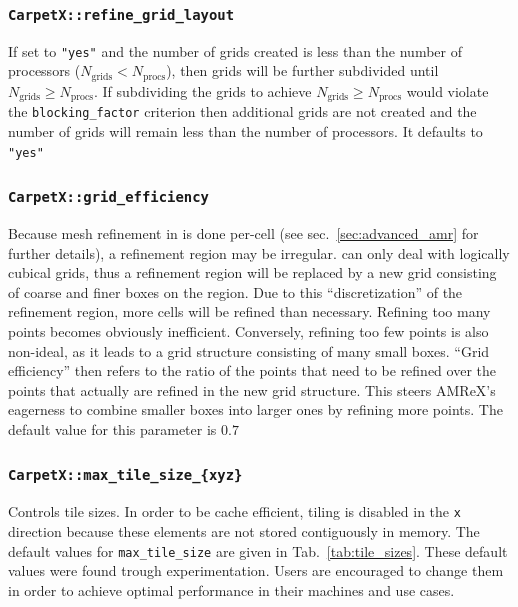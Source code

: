 \subsubsection{\texttt{CarpetX::refine\_grid\_layout}}

If set to \texttt{"yes"} and the number of grids created is less than the number of processors ($N_\text{grids} < N_\text{procs}$), then grids will be further subdivided until $N_\text{grids} \geq N_\text{procs}$. If subdividing the grids to achieve $N_\text{grids} \geq N_\text{procs}$ would violate the \texttt{blocking\_factor} criterion then additional grids are not created and the number of grids will remain less than the number of processors. It defaults to \texttt{"yes"}

\subsubsection{\texttt{CarpetX::grid\_efficiency}}

Because mesh refinement in \AMReX is done per-cell (see sec.~\ref{sec:advanced_amr} for further details), a refinement region may be irregular. \AMReX\space can only deal with logically cubical grids, thus a refinement region will be replaced by a new grid consisting of coarse and finer boxes on the region. Due to this ``discretization'' of the refinement region, more cells will be refined than necessary. Refining too many points becomes obviously inefficient. Conversely, refining too few points is also non-ideal, as it leads to a grid structure consisting of many small boxes. ``Grid efficiency'' then refers to the ratio of the points that need to be refined over the points that actually are refined in the new grid structure. This steers AMReX's eagerness to combine smaller boxes into larger ones by refining more points. The default value for this parameter is $0.7$

\subsubsection{\texttt{CarpetX::max\_tile\_size\_\{xyz\}}}

Controls tile sizes. In order to be cache efficient, tiling is disabled in the \texttt{x} direction because these elements are not stored contiguously in memory. The default values for \texttt{max\_tile\_size} are given in Tab.~\ref{tab:tile_sizes}. These default values were found trough experimentation. Users are encouraged to change them in order to achieve optimal performance in their machines and use cases.

